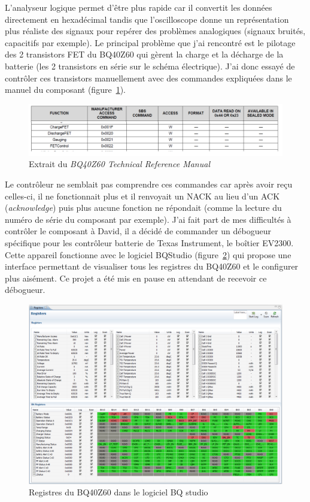 \documentclass[a4paper, 12pt, sffamily]{report}
\begin{document}
L’analyseur logique permet d’être plus rapide car il convertit les données directement en hexadécimal tandis que l’oscilloscope donne un représentation plus réaliste des signaux pour repérer des problèmes analogiques (signaux bruités, capacitifs par exemple).
Le principal problème que j’ai rencontré est le pilotage des 2 transistors FET du BQ40Z60 qui gèrent la charge et la décharge de la batterie (les 2 transistors en série sur le schéma électrique).
J’ai donc essayé de contrôler ces transistors manuellement avec des commandes expliquées dans le manuel du composant (figure~\ref{fig:BQ40Z60_manual_excerpt}).

\begin{figure}[H]
\centering
\includegraphics[scale=0.82]{figures/screenshots/BQ40Z60_manual_excerpt.png}
\caption{Extrait du \emph{BQ40Z60 Technical Reference Manual}\cite{BQ40Z60_tech_manual}} 
\label{fig:BQ40Z60_manual_excerpt}
\end{figure}

Le contrôleur ne semblait pas comprendre ces commandes car après avoir reçu celles-ci, il ne fonctionnait plus et il renvoyait un NACK au lieu d’un ACK (\emph{acknowledge}) puis plus aucune fonction ne répondait (comme la lecture du numéro de série du composant par exemple).
J’ai fait part de mes difficultés à contrôler le composant à David, il a décidé de commander un débogueur spécifique pour les contrôleur batterie de Texas Instrument, le boîtier EV2300. Cette appareil fonctionne avec le logiciel BQStudio (figure~\ref{fig:BQ40Z60_registers}) qui propose une interface permettant de visualiser tous les registres du BQ40Z60 et le configurer plus aisément. Ce projet a été mis en pause en attendant de recevoir ce débogueur.

\begin{figure}[H]
\centering
\includegraphics[scale=0.4]{figures/screenshots/BQ40Z60_registers.png}
\caption{Registres du BQ40Z60 dans le logiciel BQ studio}
\label{fig:BQ40Z60_registers}
\end{figure}
\end{document}
